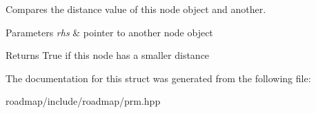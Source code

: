 Compares the distance value of this node object and another. 


\begin{DoxyParams}{Parameters}
{\em rhs} & pointer to another node object \\
\hline
\end{DoxyParams}
\begin{DoxyReturn}{Returns}
True if this node has a smaller distance 
\end{DoxyReturn}


The documentation for this struct was generated from the following file\+:\begin{DoxyCompactItemize}
\item 
roadmap/include/roadmap/prm.\+hpp\end{DoxyCompactItemize}
